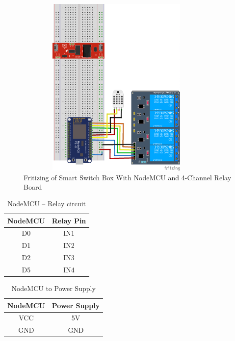 \documentclass[12pt,a4paper]{article}
\begin{document}
\begin{flushleft}

\begin{figure}[h!]
    \centering
	\includegraphics[width=10cm, height=9cm]{Prog10/4.png}
	\caption{Fritizing of Smart Switch Box With NodeMCU and 4-Channel Relay Board}
\end{figure}
\vspace{5mm}

\begin{table}[h!]
\centering
\caption{NodeMCU – Relay circuit}
\label{my-label}
\begin{tabular}{|c|c|}
\hline
\textbf{NodeMCU} & \textbf{Relay Pin} \\ \hline
D0 & IN1 \\ \hline
D1 & IN2 \\ \hline
D2 & IN3 \\ \hline
D5 & IN4 \\ \hline
\end{tabular}
\end{table}

\begin{table}[h!]
\centering
\caption{NodeMCU to Power Supply}
\label{my-label}
\begin{tabular}{|c|c|}
\hline
\textbf{NodeMCU} & \textbf{Power Supply} \\ \hline
VCC & 5V \\ \hline
GND & GND \\ \hline
\end{tabular}
\end{table}


\end{flushleft}
\end{document}
